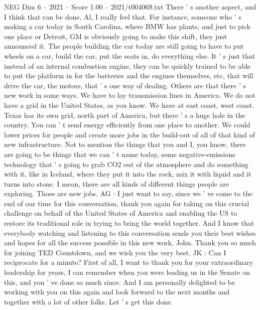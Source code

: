 \begin{textsample}{NEG Dim 6 – 2021 – Score 1.00 – 2021/t004069.txt}
There ' s another aspect, and I think that can be done, Al, I really feel that.
For instance, someone who ' s making a car today in South Carolina, where BMW has plants, and just to pick one place or Detroit, GM is obviously going to make this shift, they just announced it.
The people building the car today are still going to have to put wheels on a car, build the car, put the seats in, do everything else.
It ' s just that instead of an internal combustion engine, they can be quickly trained to be able to put the platform in for the batteries and the engines themselves, etc, that will drive the car, the motors, that ' s one way of dealing.
Others are that there ' s new work in some ways.
We have to lay transmission lines in America.
We do not have a grid in the United States, as you know.
We have at east coast, west coast.
Texas has its own grid, north part of America, but there ' s a huge hole in the country.
You can ' t send energy efficiently from one place to another.
We could lower prices for people and create more jobs in the build-out of all of that kind of new infrastructure.
Not to mention the things that you and I, you know, there are going to be things that we can ' t name today, some negative-emissions technology that ' s going to grab CO2 out of the atmosphere and do something with it, like in Iceland, where they put it into the rock, mix it with liquid and it turns into stone.
I mean, there are all kinds of different things people are exploring.
Those are new jobs.
AG : I just want to say, since we ' ve come to the end of our time for this conversation, thank you again for taking on this crucial challenge on behalf of the United States of America and enabling the US to restore its traditional role in trying to bring the world together.
And I know that everybody watching and listening to this conversation sends you their best wishes and hopes for all the success possible in this new work, John.
Thank you so much for joining TED Countdown, and we wish you the very best.
JK : Can I reciprocate for a minute?
First of all, I want to thank you for your extraordinary leadership for years, I can remember when you were leading us in the Senate on this, and you ' ve done so much since.
And I am personally delighted to be working with you on this again and look forward to the next months and together with a lot of other folks.
Let ' s get this done.

\end{textsample}
